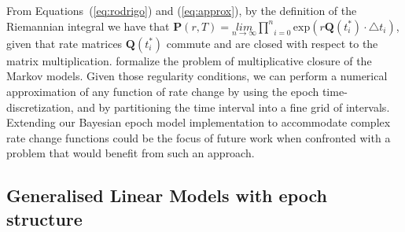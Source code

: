 \noindent
From Equations~(\ref{eq:rodrigo}) and (\ref{eq:approx}), by the definition of the Riemannian integral we have that $\mathbf{P}(r,T)=\underset{n\rightarrow\infty}{lim}\underset{i=0}{\overset{n}{\prod}}\text{exp}\left(r\mathbf{Q}(t_{i}^{*})\cdot\triangle t_{i}\right)$, given that rate matrices $\mathbf{Q}(t_{i}^{*})$ commute 
and are closed with respect to the matrix multiplication.
\citet{Sumner2012} formalize the problem of multiplicative closure of the Markov models. 
Given those regularity conditions, we can perform a numerical approximation of any function of rate change by using the epoch time-discretization, and by partitioning the time interval into a fine grid of intervals.
Extending our Bayesian epoch model implementation to accommodate complex rate change functions could be the focus of future work when confronted with a problem that would benefit from such an approach.

\subsection{Generalised Linear Models with epoch structure} %

